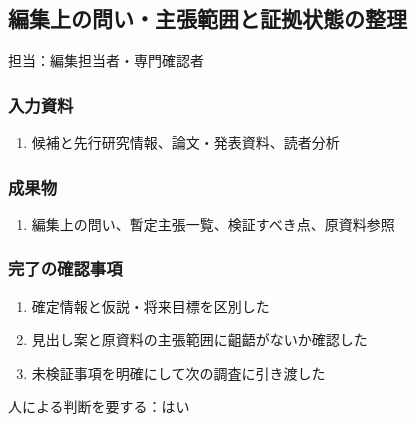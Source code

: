 \documentclass[a4paper,11pt]{article}
\begin{document}
\subsection{編集上の問い・主張範囲と証拠状態の整理}
\par 担当：編集担当者・専門確認者\par\medskip
\subsubsection*{入力資料}
\begin{enumerate}[leftmargin=2em,itemsep=0.35em]
\item 候補と先行研究情報、論文・発表資料、読者分析
\end{enumerate}
\subsubsection*{成果物}
\begin{enumerate}[leftmargin=2em,itemsep=0.35em]
\item 編集上の問い、暫定主張一覧、検証すべき点、原資料参照
\end{enumerate}
\subsubsection*{完了の確認事項}
\begin{enumerate}[leftmargin=2em,itemsep=0.35em]
\item 確定情報と仮説・将来目標を区別した
\item 見出し案と原資料の主張範囲に齟齬がないか確認した
\item 未検証事項を明確にして次の調査に引き渡した
\end{enumerate}
\par 人による判断を要する：はい\par\medskip
\end{document}
